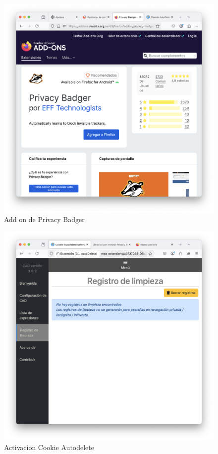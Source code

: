 \begin{figure}[H]   
    \includegraphics[width=15cm]{addon_privacybadger.png}
    \caption{Add on de Privacy Badger}
    \label{fig:addon_privacybadger}
\end{figure}

\begin{figure}[H]   
    \includegraphics[width=15cm]{activacion_cookie_autodelete.png}
    \caption{Activacion Cookie Autodelete}
    \label{fig:activacion_cookie_autodelete}
\end{figure}

